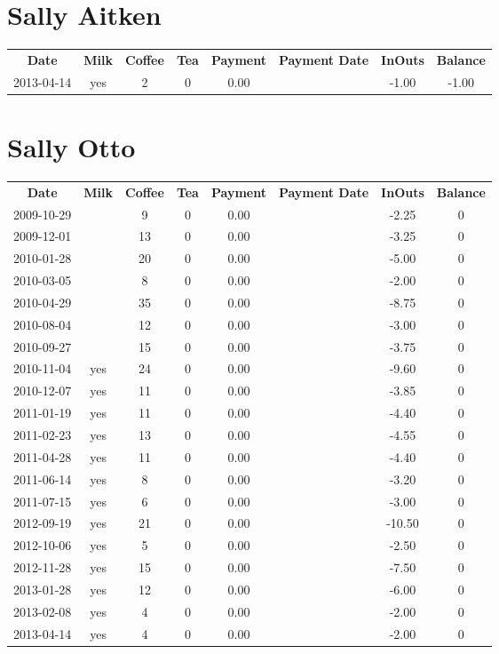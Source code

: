 \section{Sally Aitken}

\begin{center}
\begin{tabular}{cccccccc}
\textbf{Date} & \textbf{Milk} & \textbf{Coffee} & \textbf{Tea} & \textbf{Payment} & \textbf{Payment Date} & \textbf{InOuts} & \textbf{Balance} \\
2013-04-14 & yes & 2 & 0 & 0.00 &  & -1.00 & -1.00
\end{tabular}
\end{center}

\section{Sally Otto}

\begin{center}
\begin{tabular}{cccccccc}
\textbf{Date} & \textbf{Milk} & \textbf{Coffee} & \textbf{Tea} & \textbf{Payment} & \textbf{Payment Date} & \textbf{InOuts} & \textbf{Balance} \\
2009-10-29 &  &  9 & 0 & 0.00 &  &  -2.25 & 0\\ 
2009-12-01 &  & 13 & 0 & 0.00 &  &  -3.25 & 0\\ 
2010-01-28 &  & 20 & 0 & 0.00 &  &  -5.00 & 0\\ 
2010-03-05 &  &  8 & 0 & 0.00 &  &  -2.00 & 0\\ 
2010-04-29 &  & 35 & 0 & 0.00 &  &  -8.75 & 0\\ 
2010-08-04 &  & 12 & 0 & 0.00 &  &  -3.00 & 0\\ 
2010-09-27 &  & 15 & 0 & 0.00 &  &  -3.75 & 0\\ 
2010-11-04 & yes & 24 & 0 & 0.00 &  &  -9.60 & 0\\ 
2010-12-07 & yes & 11 & 0 & 0.00 &  &  -3.85 & 0\\ 
2011-01-19 & yes & 11 & 0 & 0.00 &  &  -4.40 & 0\\ 
2011-02-23 & yes & 13 & 0 & 0.00 &  &  -4.55 & 0\\ 
2011-04-28 & yes & 11 & 0 & 0.00 &  &  -4.40 & 0\\ 
2011-06-14 & yes &  8 & 0 & 0.00 &  &  -3.20 & 0\\ 
2011-07-15 & yes &  6 & 0 & 0.00 &  &  -3.00 & 0\\ 
2012-09-19 & yes & 21 & 0 & 0.00 &  & -10.50 & 0\\ 
2012-10-06 & yes &  5 & 0 & 0.00 &  &  -2.50 & 0\\ 
2012-11-28 & yes & 15 & 0 & 0.00 &  &  -7.50 & 0\\ 
2013-01-28 & yes & 12 & 0 & 0.00 &  &  -6.00 & 0\\ 
2013-02-08 & yes &  4 & 0 & 0.00 &  &  -2.00 & 0\\ 
2013-04-14 & yes &  4 & 0 & 0.00 &  &  -2.00 & 0
\end{tabular}
\end{center}

